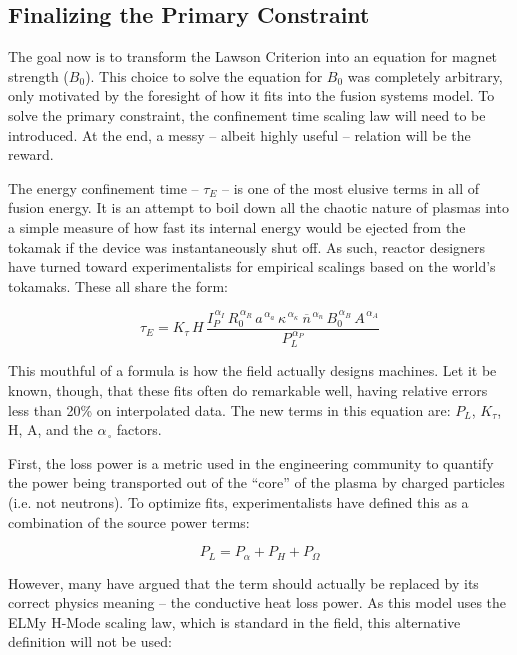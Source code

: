 \subsection{Finalizing the Primary Constraint}

The goal now is to transform the Lawson Criterion into an equation for magnet strength ($B_0$). This choice to solve the equation for $B_0$ was completely arbitrary, only motivated by the foresight of how it fits into the fusion systems model. To solve the primary constraint, the confinement time scaling law will need to be introduced. At the end, a messy -- albeit highly useful -- relation will be the reward.

The energy confinement time -- $\tau_E$ -- is one of the most elusive terms in all of fusion energy. It is an attempt to boil down all the chaotic nature of plasmas into a simple measure of how fast its internal energy would be ejected from the tokamak if the device was instantaneously shut off. As such, reactor designers have turned toward experimentalists for empirical scalings based on the world's tokamaks. These all share the form:

\begin{equation}
	\tau_E = K_\tau \, H \, \frac{
		I_P^{\,\alpha_I} \, R_0^{\,\alpha_R} \, a^{\,\alpha_a} \, \kappa^{\,\alpha_\kappa} \ \overline{n}^{\,\alpha_n} \, B_0^{\,\alpha_B} \, A^{\,\alpha_A}
	}{ P_L ^ {\,\alpha_P} }
	\label{eq:tau_gen}
\end{equation}

This mouthful of a formula is how the field actually designs machines. Let it be known, though, that these fits often do remarkable well, having relative errors less than 20\% on interpolated data. The new terms in this equation are: $P_L$, $K_\tau$, H, A, and the $\alpha_{\,\square}$ factors. 

First, the loss power is a metric used in the engineering community to quantify the power being transported out of the ``core'' of the plasma by charged particles (i.e. not neutrons). \cite{process} To optimize fits, experimentalists have defined this as a combination of the source power terms:

\begin{equation}
	\label{eq:pl}
	P_L = P_\alpha + P_H + P_\Omega
\end{equation}

However, many have argued that the term should actually be replaced by its correct physics meaning -- the conductive heat loss power. As this model uses the ELMy H-Mode scaling law, which is standard in the field, this alternative definition will not be used:

